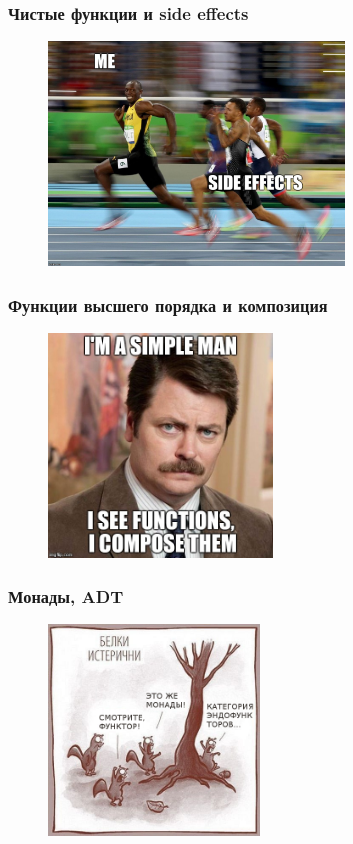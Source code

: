 \documentclass[18pt, compress, aspectratio=169]{beamer}
\begin{document}
\begin{frame}
    \frametitle{Чистые функции и side effects}
    \vspace{-25pt}
    \begin{figure}
        \includegraphics[width=0.7\textwidth,center]{side_effect.jpg}
    \end{figure}
\end{frame}

\begin{frame}
    \frametitle{Функции высшего порядка и композиция}
    \vspace{-25pt}
    \begin{figure}
        \includegraphics[width=0.53\textwidth,center]{function_composition.jpg}
    \end{figure}
\end{frame}

\begin{frame}
    \frametitle{Монады, ADT}
    \vspace{-20pt}
    \begin{figure}
        \includegraphics[width=0.5\textwidth,center]{squirells.png}
    \end{figure}
\end{frame}
\end{document}
